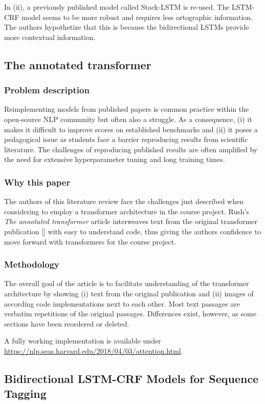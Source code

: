 \documentclass[11pt]{article}
\begin{document}
In (ii), a previously published model called Stack-LSTM is re-used. The LSTM-CRF model seems to be more robust and requires less ortographic information. The authors hypothetize that this is because the bidirectional LSTMs provide more contextual information. 

\subsection{The annotated transformer
\citet{rush-2018-annotated} }
\subsubsection{Problem description}
Reimplementing models from published papers is common practice within the open-source NLP community but often also a struggle. As a consequence, (i) it makes it difficult to improve scores on established benchmarks and (ii) it poses a pedagogical issue as students face a barrier reproducing results from scientific literature. The challenges of reproducing published results are often amplified by the need for extensive hyperparameter tuning and long training times.
\subsubsection{Why this paper}
The authors of this literature review face the challenges just described when considering to employ a transformer architecture in the course project. Rush's \emph{The annotated transformer} article interweaves text from the original transformer publication [\citet{NIPS2017_3f5ee243}] with easy to understand code, thus giving the authors confidence to move forward with transformers for the course project.
\subsubsection{Methodology}
The overall goal of the article is to facilitate understanding of the transformer architecture by showing (i) text from the original publication and (ii) images of according code implementations next to each other. Most text passages are verbatim repetitions of the original passages. Differences exist, however, as some sections have been reordered or deleted.

A fully working implementation is available under \url{https://nlp.seas.harvard.edu/2018/04/03/attention.html}.


\subsection{Bidirectional LSTM-CRF Models for Sequence Tagging \citet{DBLP:journals/corr/HuangXY15} }
\end{document}
